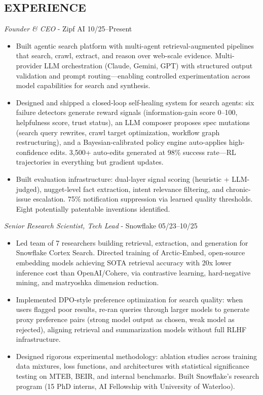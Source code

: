 \documentclass[line,margin]{res}
\begin{document}
\begin{resume}
\section{EXPERIENCE}
{\sl Founder \& CEO} - Zipf AI \hfill 10/25--Present
\begin{itemize} \itemsep -4pt
\item Built agentic search platform with multi-agent retrieval-augmented pipelines that search, crawl, extract, and reason over web-scale evidence. Multi-provider LLM orchestration (Claude, Gemini, GPT) with structured output validation and prompt routing---enabling controlled experimentation across model capabilities for search and synthesis.
\item Designed and shipped a closed-loop self-healing system for search agents: six failure detectors generate reward signals (information-gain score 0--100, helpfulness score, trust status), an LLM composer proposes spec mutations (search query rewrites, crawl target optimization, workflow graph restructuring), and a Bayesian-calibrated policy engine auto-applies high-confidence edits. 3,500+ auto-edits generated at 98\% success rate---RL trajectories in everything but gradient updates.
\item Built evaluation infrastructure: dual-layer signal scoring (heuristic + LLM-judged), nugget-level fact extraction, intent relevance filtering, and chronic-issue escalation. 75\% notification suppression via learned quality thresholds. Eight potentially patentable inventions identified.
\end{itemize}
{\sl Senior Research Scientist, Tech Lead} - Snowflake \hfill 05/23--10/25
\begin{itemize} \itemsep -4pt
\item Led team of 7 researchers building retrieval, extraction, and generation for Snowflake Cortex Search. Directed training of Arctic-Embed, open-source embedding models achieving SOTA retrieval accuracy with 20x lower inference cost than OpenAI/Cohere, via contrastive learning, hard-negative mining, and matryoshka dimension reduction.
\item Implemented DPO-style preference optimization for search quality: when users flagged poor results, re-ran queries through larger models to generate proxy preference pairs (strong model output as chosen, weak model as rejected), aligning retrieval and summarization models without full RLHF infrastructure.
\item Designed rigorous experimental methodology: ablation studies across training data mixtures, loss functions, and architectures with statistical significance testing on MTEB, BEIR, and internal benchmarks. Built Snowflake's research program (15 PhD interns, AI Fellowship with University of Waterloo).

\end{itemize}
\end{resume}
\end{document}
